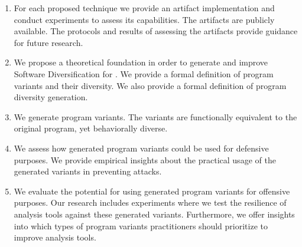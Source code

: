 \begin{enumerate}[label=\textbf{C\arabic*}, ref=C\arabic*]
	\item \label{methodcontrib}  For each proposed technique we provide an artifact implementation and conduct experiments to assess its capabilities. The artifacts are publicly available. The protocols and results of assessing the artifacts provide guidance for future research.
	
	\item \label{therycontrib}  We propose a theoretical foundation in order to generate and improve Software Diversification for \Wasm. We provide a formal definition of \Wasm program variants and their diversity. We also provide a formal definition of \Wasm program diversity generation.
	
	\item \label{generationcontrib}  We generate \Wasm program variants. The variants are functionally equivalent to the original program, yet behaviorally diverse.
	
	\item \label{defensivecontrib}  We assess how generated \Wasm program variants could be used for defensive purposes. We provide empirical insights about the practical usage of the generated variants in preventing attacks.
	
	\item \label{ofensivecontrib}  
	We evaluate the potential for using generated \Wasm program variants for offensive purposes. 
	Our research includes experiments where we test the resilience of \Wasm analysis tools against these generated variants. 
	Furthermore, we offer insights into which types of program variants practitioners should prioritize to improve \Wasm analysis tools.

	
\end{enumerate}

